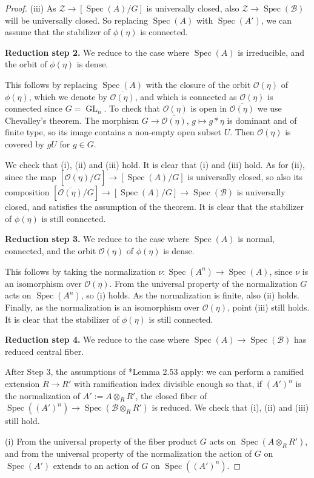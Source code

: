 \documentclass{amsart}
\newcommand{\cB}{\mathcal{B}}
\newcommand{\cO}{\mathcal{O}}
\newcommand{\cZ}{\mathcal{Z}}
\newcommand{\qB}{R}
\newcommand{\qR}{\cB}
\newcommand{\spec}{\operatorname{Spec}}
\newcommand{\GL}{\operatorname{GL}}
\theoremstyle{definition}
\begin{document}
\begin{proof}
(iii) As $\cZ\to [\spec(A)/G]$ is universally closed, also $\cZ\to \spec(\qR)$ will be universally closed. So replacing $\spec(A)$ with $\spec(A')$, we can assume that the stabilizer of $\phi(\eta)$ is connected.

\textbf{Reduction step 2.}
We reduce to the case where $\spec(A)$ is irreducible, and the orbit of $\phi(\eta)$ is dense.

This follows by replacing $\spec(A)$ with the closure of the orbit $\cO(\eta)$ of $\phi(\eta)$, which we denote by $\overline{\cO(\eta)}$, and which is connected as $\cO(\eta)$ is connected since $G=\GL_n$. To check that $\cO(\eta)$ is open in $\overline{\cO(\eta)}$ we use Chevalley's theorem. The morphism $G\to \overline{\cO(\eta)}$, $g\mapsto g*\eta$ is dominant and of finite type, so its image contains a non-empty open subset $U$. Then $\cO(\eta)$ is covered by $gU$ for $g\in G$.

We check that (i), (ii) and (iii) hold. It is clear that (i) and (iii) hold. As for (ii), since the map $[\overline{\cO(\eta)}/G]\to [\spec(A)/G]$ is universally closed, so also its composition $[\overline{\cO(\eta)}/G]\to [\spec(A)/G]\to\spec(\qR)$ is universally closed, and satisfies the assumption of the theorem. It is clear that the stabilizer of $\phi(\eta)$ is still connected.

\textbf{Reduction step 3.}
We reduce to the case where $\spec(A)$ is normal, connected, and the orbit $\cO(\eta)$ of $\phi(\eta)$ is dense.

This follows by taking the normalization $\nu:\spec(A^n)\to \spec(A)$, since $\nu$ is an isomorphism over $\cO(\eta)$. From the universal property of the normalization $G$ acts on $\spec(A^n)$, so (i) holds. As the normalization is finite, also (ii) holds. Finally, as the normalization is an isomorphism over $\cO(\eta)$, point (iii) still holds. It is clear that the stabilizer of $\phi(\eta)$ is still connected.

\textbf{Reduction step 4.} We reduce to the case where $\spec(A)\to \spec(\qR)$ has reduced central fiber.

After Step 3, the assumptions of 
\cite{kollar_modbook}*{Lemma 2.53} apply: we can perform a ramified extension $\qB\to \qB'$ with ramification index divisible enough so that, if $(A')^n$ is the normalization of $A':=A\otimes_\qB \qB'$, the closed fiber of $\spec((A')^n)\to \spec(\qR\otimes_\qB \qB')$ is reduced. We check that (i), (ii) and (iii) still hold.

(i) From the universal property of the fiber product $G$ acts on $\spec(A\otimes_\qB \qB')$, and from the universal property of the normalization the action of $G $ on $\spec(A')$ extends to an action of $G$ on $\spec((A')^n)$.


\end{proof}
\end{document}
